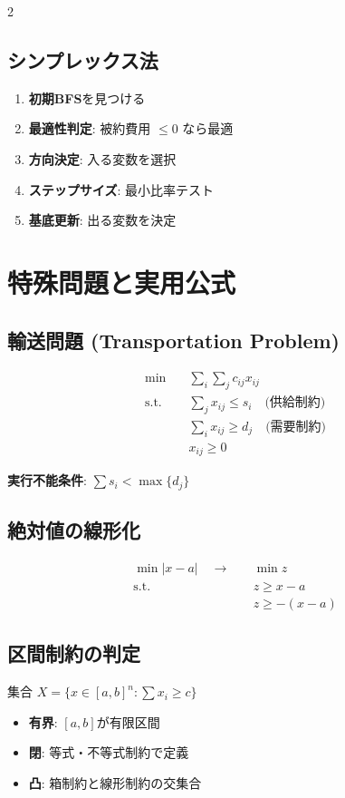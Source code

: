 \documentclass[10pt,a4paper,landscape]{article}
\begin{document}
\begin{multicols}{2}
\subsection*{シンプレックス法}
\begin{enumerate}
\item \textbf{初期BFS}を見つける
\item \textbf{最適性判定}: 被約費用 $\leq 0$ なら最適
\item \textbf{方向決定}: 入る変数を選択
\item \textbf{ステップサイズ}: 最小比率テスト
\item \textbf{基底更新}: 出る変数を決定
\end{enumerate}

\columnbreak

\section*{特殊問題と実用公式}

\subsection*{輸送問題 (Transportation Problem)}
\begin{align}
\min \quad & \sum_i \sum_j c_{ij} x_{ij} \\
\text{s.t.} \quad & \sum_j x_{ij} \leq s_i \quad \text{(供給制約)} \\
& \sum_i x_{ij} \geq d_j \quad \text{(需要制約)} \\
& x_{ij} \geq 0
\end{align}

\textbf{実行不能条件}: $\sum s_i < \max\{d_j\}$

\subsection*{絶対値の線形化}
\begin{align}
\min |x - a| \quad \rightarrow \quad & \min z \\
\text{s.t.} \quad & z \geq x - a \\
& z \geq -(x - a)
\end{align}

\subsection*{区間制約の判定}
集合 $X = \{x \in [a,b]^n : \sum x_i \geq c\}$
\begin{itemize}
\item \textbf{有界}: $[a,b]$が有限区間
\item \textbf{閉}: 等式・不等式制約で定義
\item \textbf{凸}: 箱制約と線形制約の交集合
\end{itemize}


\end{multicols}
\end{document}
